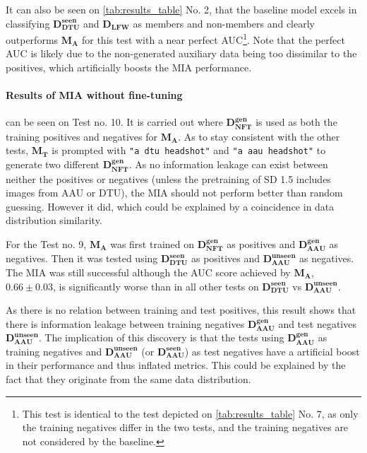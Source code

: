 It can also be seen on \cref{tab:results_table} No. 2, that the baseline model excels in classifying $\mathbf{D_{DTU}^{seen}}$ and $\mathbf{D_{LFW}}$ as members and non-members and clearly outperforms $\mathbf{M_A}$ for this test with a near perfect AUC\footnote{This test is identical to the test depicted on \cref{tab:results_table} No. 7, as only the training negatives differ in the two tests, and the training negatives are not considered by the baseline.}. Note that the perfect AUC is likely due to the non-generated auxiliary data being too dissimilar to the positives, which artificially boosts the MIA performance.




\paragraph{Results of MIA without fine-tuning }
can be seen on Test no. 10. It is carried out where $\mathbf{D_{NFT}^{gen}}$ is used as both the training positives and negatives for  $\mathbf{M_{A}}$. As to stay consistent with the other tests, $\mathbf{M_T}$ is prompted with \texttt{"a dtu headshot"} and \texttt{"a aau headshot"} to generate two different $\mathbf{D_{NFT}^{gen}}$. As no information leakage can exist between neither the positives or negatives (unless the pretraining of SD 1.5 includes images from AAU or DTU), the MIA should not perform better than random guessing. However it did, which could be explained by a coincidence in data distribution similarity.

For the Test no. 9, $\mathbf{M_A}$ was first trained on $\mathbf{D_{NFT}^{gen}}$ as positives and $\mathbf{D_{AAU}^{gen}}$ as negatives. Then it was tested using $\mathbf{D_{DTU}^{seen}}$ as positives and $\mathbf{D_{AAU}^{unseen}}$ as negatives.
The MIA was still successful although the AUC score achieved by $\mathbf{M_A}$, $0.66\pm0.03$, is significantly worse than in all other tests on $\mathbf{D_{DTU}^{seen}}$ vs $\mathbf{D_{AAU}^{unseen}}$.

As there is no relation between training and test positives, this result shows that there is information leakage between training negatives $\mathbf{D_{AAU}^{gen}}$ and test negatives $\mathbf{D_{AAU}^{unseen}}$. The implication of this discovery is that the tests using $\mathbf{D_{AAU}^{gen}}$ as training negatives and $\mathbf{D_{AAU}^{unseen}}$ (or $\mathbf{D_{AAU}^{seen}}$) as test negatives have a artificial boost in their performance and thus inflated metrics.  This could be explained by the fact that they originate from the same data distribution.

